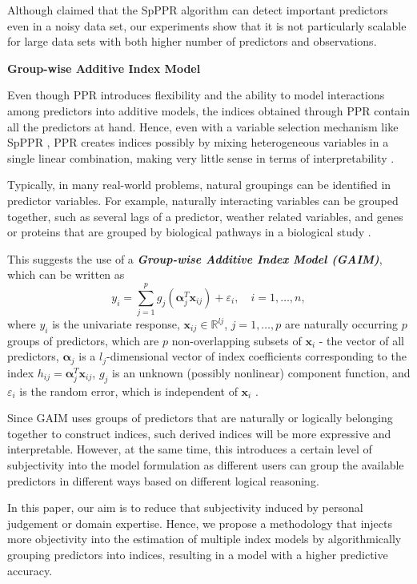 \documentclass[
  11pt,
  a4paper,
]{article}
\begin{document}
Although \textcite{Zhang2008} claimed that the SpPPR algorithm can
detect important predictors even in a noisy data set, our experiments
show that it is not particularly scalable for large data sets with both
higher number of predictors and observations. \newline

\textbf{Group-wise Additive Index Model}

Even though PPR introduces flexibility and the ability to model
interactions among predictors into additive models, the indices obtained
through PPR contain all the predictors at hand. Hence, even with a
variable selection mechanism like SpPPR \autocite{Zhang2008}, PPR
creates indices possibly by mixing heterogeneous variables in a single
linear combination, making very little sense in terms of
interpretability \autocite{Masselot2022}.

Typically, in many real-world problems, natural groupings can be
identified in predictor variables. For example, naturally interacting
variables can be grouped together, such as several lags of a predictor,
weather related variables, and genes or proteins that are grouped by
biological pathways in a biological study
\autocite{Masselot2022,Wang2015}.

This suggests the use of a \textbf{\emph{Group-wise Additive Index Model
(GAIM)}}, which can be written as \[
  y_{i} = \sum_{j = 1}^{p} g_{j}(\bm{\alpha}_{j}^{T}\bm{x}_{ij}) + \varepsilon_{i}, \quad i = 1, \dots, n,
\] where \(y_{i}\) is the univariate response,
\(\bm{x}_{ij} \in \mathbb{R}^{l{j}}\), \(j = 1, \dots, p\) are naturally
occurring \(p\) groups of predictors, which are \(p\) non-overlapping
subsets of \(\bm{x}_{i}\) - the vector of all predictors,
\(\bm{\alpha}_{j}\) is a \(l_{j}\)-dimensional vector of index
coefficients corresponding to the index
\(h_{ij} = \bm{\alpha}_{j}^{T}\bm{x}_{ij}\), \(g_{j}\) is an unknown
(possibly nonlinear) component function, and \(\varepsilon_{i}\) is the
random error, which is independent of \(\bm{x}_{i}\)
\autocite{Wang2015-mp,Masselot2022}.

Since GAIM uses groups of predictors that are naturally or logically
belonging together to construct indices, such derived indices will be
more expressive and interpretable. However, at the same time, this
introduces a certain level of subjectivity into the model formulation as
different users can group the available predictors in different ways
based on different logical reasoning.

In this paper, our aim is to reduce that subjectivity induced by
personal judgement or domain expertise. Hence, we propose a methodology
that injects more objectivity into the estimation of multiple index
models by algorithmically grouping predictors into indices, resulting in
a model with a higher predictive accuracy. \newline
\end{document}
